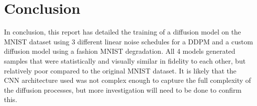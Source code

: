 
\section{Conclusion}\label{sec:conclusion}
In conclusion, this report has detailed the training of a diffusion model on the MNIST dataset using 3 different linear
noise schedules for a DDPM and a custom diffusion model using a fashion MNIST degradation.
All 4 models generated samples that were statistically and visually similar in fidelity to each other, but relatively
poor compared to the original MNIST dataset.
It is likely that the CNN architecture used was not complex enough to capture the full complexity of the diffusion processes,
but more investigation will need to be done to confirm this.
